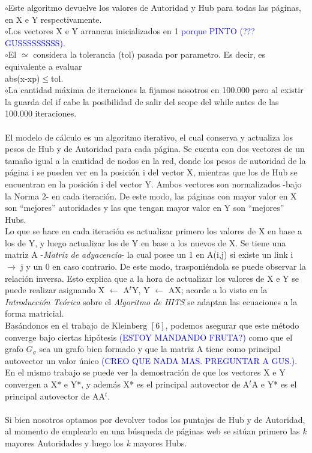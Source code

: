 \documentclass[a4paper]{article}
\begin{document}
$\circ$Este algoritmo devuelve los valores de Autoridad y Hub para todas las p\'aginas, en X e Y respectivamente.\\
\indent $\circ$Los vectores X e Y arrancan inicializados en 1 \textcolor{blue}{ porque PINTO (??? GUSSSSSSSSS).}\\
\indent $\circ$El $\simeq$ considera la tolerancia (tol) pasada por parametro. Es decir, es equivalente a evaluar \\ abs(x-xp)$\leq$tol. \\
\indent $\circ$La cantidad m\'axima de iteraciones la fijamos nosotros en 100.000 pero al existir la guarda del if cabe la posibilidad de salir del scope del while antes de las 100.000 iteraciones. \\
\\
\indent El modelo de c\'alculo es un algoritmo iterativo, el cual conserva y actualiza los pesos de Hub y de Autoridad para cada p\'agina. Se cuenta con dos vectores de un tama\~no igual a la cantidad de nodos en la red, donde los pesos de autoridad de la p\'agina i se pueden ver en la posici\'on i del vector X, mientras que los de Hub se encuentran en la posici\'on i del vector Y. Ambos vectores son normalizados -bajo la Norma 2- en cada iteraci\'on. De este modo, las p\'aginas con mayor valor en X son ``mejores'' autoridades y las que tengan mayor valor en Y son ``mejores'' Hubs. \\
\indent Lo que se hace en cada iteraci\'on es actualizar primero los valores de X en base a los de Y, y luego actualizar los de Y en base a los nuevos de X. Se tiene una matriz A -\textit{Matriz de adyacencia}- la cual posee un 1 en A(i,j) si existe un link i $\rightarrow$ j y un 0 en caso contrario. De este modo, trasponi\'endola se puede observar la relaci\'on inversa. Esto explica que a la hora de actualizar los valores de X e Y se puede realizar asignando X $\leftarrow$ A$^t$Y, Y $\leftarrow$ AX; acorde a lo visto en la \emph{Introducci\'on Te\'orica} sobre el \textit{Algoritmo de HITS} se adaptan las ecuaciones a la forma matricial.\\ 
\indent Bas\'andonos en el trabajo de Kleinberg $[6]$, podemos asegurar que este m\'etodo converge bajo ciertas hip\'otesis \textcolor{blue}{(ESTOY MANDANDO FRUTA?)} como que el grafo $G_\sigma$ sea un grafo bien formado y que la matriz A tiene como principal autovector un valor \'unico \textcolor{blue}{(CREO QUE NADA MAS. PREGUNTAR A GUS.)}. En el mismo trabajo se puede ver la demostraci\'on  de que los vectores X e Y convergen a X* e Y*, y adem\'as X* es el principal autovector de A$^t$A e Y* es el principal autovector de AA$^t$.\\
\\
\indent Si bien nosotros optamos por devolver todos los puntajes de Hub y de Autoridad, al momento de emplearlo en una b\'usqueda de p\'aginas web se sit\'uan primero las \emph{k} mayores Autoridades y luego los \emph{k} mayores Hubs.
\end{document}
